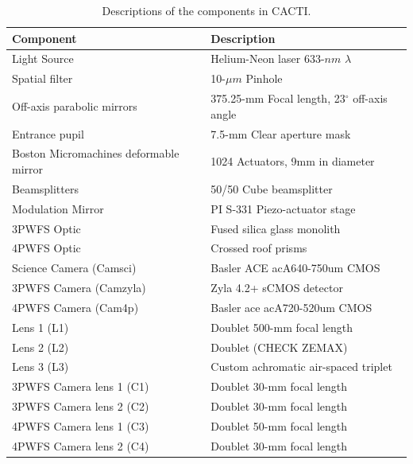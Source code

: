 \documentclass[12pt]{spieman}  %
\begin{document}
\begin{spacing}{2}
\begin{table}
	\begin{center}
		\begin{tabular}{ | l| l | }
			\hline
			\textbf{Component}& \textbf{Description}\\ \hline
			Light Source & Helium-Neon laser 633-$nm$ $\lambda$\\ \hline
			Spatial filter & 10-$\mu m$ Pinhole \\ \hline
			Off-axis parabolic mirrors & 375.25-mm Focal length, 23$^{\circ}$ off-axis angle \\ \hline
            Entrance pupil & 7.5-mm Clear aperture mask \\ \hline
            Boston Micromachines deformable mirror & 1024 Actuators, 9mm in diameter \\ \hline
            Beamsplitters & 50/50 Cube beamsplitter \\ \hline
            Modulation Mirror &  PI S-331 Piezo-actuator stage \\ \hline
            3PWFS Optic & Fused silica glass monolith \\ \hline
            4PWFS Optic & Crossed roof prisms \\ \hline
            Science Camera (Camsci) & Basler ACE acA640-750um CMOS\\ \hline
            3PWFS Camera (Camzyla) & Zyla 4.2+ sCMOS detector \\ \hline
            4PWFS Camera (Cam4p) & Basler ace acA720-520um CMOS \\ \hline
            Lens 1 (L1) & Doublet 500-mm focal length  \\ \hline
            Lens 2 (L2) & Doublet (CHECK ZEMAX)  \\ \hline
            Lens 3 (L3) & Custom achromatic air-spaced triplet  \\ \hline
            3PWFS Camera lens 1 (C1) & Doublet 30-mm focal length \\ \hline
            3PWFS Camera lens 2 (C2) & Doublet 30-mm focal length \\ \hline
            4PWFS Camera lens 1 (C3) & Doublet 50-mm focal length \\ \hline
            4PWFS Camera lens 2 (C4) & Doublet 30-mm focal length \\ \hline
				
			\end{tabular}
		\end{center}
	\caption{Descriptions of the components in CACTI.}
	\label{tab:CACTItable}
\end{table}


\end{spacing}
\end{document}
